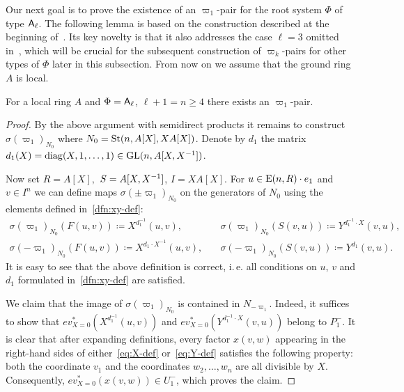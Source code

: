Our next goal is to prove the existence of an $\varpi_1$-pair for the root system $\Phi$ of type $\mathsf{A}_\ell$.
The following lemma is based on the construction described at the beginning of~\cite[\S~3]{Tu83}.
Its key novelty is that it also addresses the case \( \ell = 3 \) omitted in~\cite{Tu83}, which will be crucial for the subsequent construction of \( \varpi_k \)-pairs for other types of \( \Phi \) later in this subsection.
From now on we assume that the ground ring $A$ is local.

\begin{prop} \label{prop:sigma-construction}
    For a local ring $A$ and $\Phi = \mathsf{A}_\ell$, $\ell + 1 = n \geq 4$ there exists an $\varpi_1$-pair.
\end{prop}
\begin{proof}
    By the above argument with semidirect products it remains to construct $\sigma(\varpi_1)_{N_0}$ where $N_0 = \operatorname{St}(n, A[X], XA[X])$.
    Denote by $d_1$ the matrix $d_1(X) = \mathrm{diag}(X, 1, \ldots, 1) \in \operatorname{GL}(n, A[X, X^{-1}])$.

    Now set $R = A[X],$ $S = A[X, X^{-1}]$, $I = XA[X]$.
    For $u \in \operatorname{E}(n, R) \cdot e_1$ and $v \in I^n$ we can define maps $\sigma(\pm\varpi_1)_{N_0}$ on the generators of $N_{0}$ using the elements defined in~\cref{dfn:xy-def}:
    \begin{align}
      \sigma(\varpi_1)_{N_0} \left(F(u, v)\right) \coloneqq X^{d_1^{-1}}(u, v), & \quad \sigma(\varpi_1)_{N_0} \left(S(v, u)\right) \coloneqq Y^{d_1^{-1} \cdot X}(v, u), \label{eq:def-sigma-1} \\
      \sigma(-\varpi_1)_{N_0} \left(F(u, v)\right) \coloneqq X^{d_1 \cdot X^{-1}}(u, v),& \quad \sigma(-\varpi_1)_{N_0} \left(S(v, u)\right) \coloneqq Y^{d_1}(v, u). \label{eq:def-sigma-2}
    \end{align}
    It is easy to see that the above definition is correct, i.\,e. all conditions on $u$, $v$ and $d_1$ formulated in~\cref{dfn:xy-def} are satisfied.

    We claim that the image of $\sigma(\varpi_1)_{N_0}$ is contained in $N_{-\varpi_1}$.
    Indeed, it suffices to show that $ev_{X=0}^*(X^{d_1^{-1}}(u, v))$ and $ev_{X=0}^*(Y^{d^{-1}_1 \cdot X}(v, u))$ belong to $P_1^-$.
    It is clear that after expanding definitions, every factor $x(v, w)$ appearing in the right-hand sides of either~\eqref{eq:X-def} or~\eqref{eq:Y-def}
     satisfies the following property: both the coordinate $v_1$ and the coordinates $w_2, \ldots, w_n$ are all divisible by $X$.
    Consequently, $ev_{X=0}^* \left(x(v, w)\right) \in U_1^-$, which proves the claim.


\end{proof}
